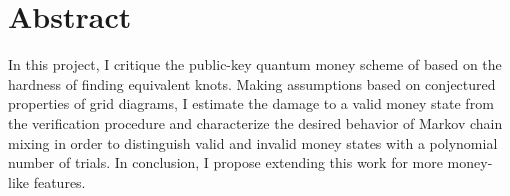 \section{Abstract}

In this project, I critique the public-key quantum money scheme of
\cite{Farhi2010} based on the hardness of finding equivalent
knots. Making assumptions based on conjectured properties
of grid diagrams,
I estimate the damage to a valid
money state from the verification procedure and characterize the
desired behavior of Markov chain mixing in order to distinguish
valid and invalid money states with a polynomial number of trials.
In conclusion, I propose extending this work for more money-like
features.